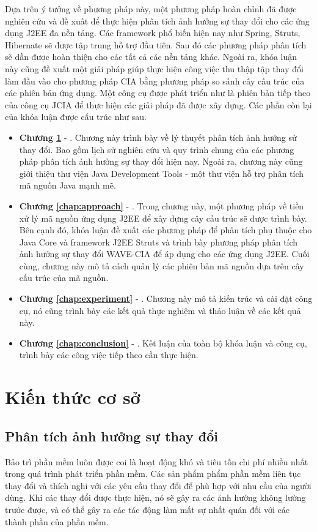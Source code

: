 \documentclass[12pt]{report}
\begin{document}
Dựa trên ý tưởng về phương pháp này, một phương pháp hoàn chỉnh đã được nghiên
cứu và đề xuất để thực hiện phân tích ảnh hưởng sự thay đổi cho các ứng dụng J2EE đa
nền tảng. Các framework phổ biến hiện nay như Spring, Struts, Hibernate sẽ được tập trung
hỗ trợ đầu tiên. Sau đó các phương pháp phân tích sẽ dần được hoàn thiện cho các tất cả các nền tảng khác. Ngoài ra, khóa luận này cũng đề xuất một giải pháp giúp thực hiện công việc thu thập tập thay đổi làm đầu vào cho phương pháp CIA bằng phương pháp so sánh cây cấu trúc của các phiên bản ứng dụng. Một công cụ được phát triển như là phiên bản tiếp theo của công cụ JCIA để thực hiện các giải pháp đã được xây dựng. Các phần còn lại của khóa luận được cấu trúc như sau.
\begin{itemize}
\item \textbf{Chương \ref{chap:background}} - . Chương này trình bày về lý thuyết phân tích ảnh hưởng sử thay đổi. Bao gồm lịch sử nghiên cứu và quy trình chung của các phương pháp phân tích ảnh hưởng sự thay đổi hiện nay. Ngoài ra, chương này cũng giới thiệu thư viện Java Development Tools - một thư viện hỗ trợ phân tích mã nguồn Java mạnh mẽ.
\item \textbf{Chương \ref{chap:approach}} - . Trong chương này, một phương pháp về tiền xử lý mã nguồn ứng dụng J2EE để xây dựng cây cấu trúc sẽ được trình bày. Bên cạnh đó, khóa luận đề xuất các phương pháp để phân tích phụ thuộc cho Java Core và framework J2EE Struts và trình bày phương pháp phân tích ảnh hưởng sự thay đổi WAVE-CIA để áp dụng cho các ứng dụng J2EE. Cuối cùng, chương này mô tả cách quản lý các phiên bản mã nguồn dựa trên cây cấu trúc của mã nguồn.
\item \textbf{Chương \ref{chap:experiment}} - . Chương này mô tả kiến trúc và cài đặt công cụ, nó cũng trình bày các kết quả thực nghiệm và thảo luận về các kết quả này.
\item \textbf{Chương \ref{chap:conclusion}} - . Kết luận của toàn bộ khóa luận và công cụ, trình bày các công việc tiếp theo cần thực hiện.
\end{itemize}


\newpage	
\chapter{Kiến thức cơ sở}
\label{chap:background}
\section{Phân tích ảnh hưởng sự thay đổi}
Bảo trì phần mềm luôn được coi là hoạt động khó và tiêu tốn chi phí nhiều nhất trong quá trình phát triển phần mềm. Các sản phẩm phẩm phần mềm liên tục thay đổi và thích nghi với các yêu cầu thay đổi để phù hợp với nhu cầu của người dùng. Khi các thay đổi được thực hiện, nó sẽ gây ra các ảnh hướng không lường trước được, và có thể gây ra các tác động làm mất sự nhất quán đối với các thành phần của phần mềm.
\end{document}
